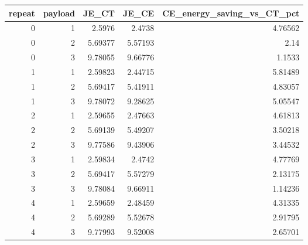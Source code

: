 \begin{tabular}{rrrrr}
\toprule
repeat & payload & JE\_CT & JE\_CE & CE\_energy\_saving\_vs\_CT\_pct \\
\midrule
0 & 1 & 2.5976 & 2.4738 & 4.76562 \\
0 & 2 & 5.69377 & 5.57193 & 2.14 \\
0 & 3 & 9.78055 & 9.66776 & 1.1533 \\
1 & 1 & 2.59823 & 2.44715 & 5.81489 \\
1 & 2 & 5.69417 & 5.41911 & 4.83057 \\
1 & 3 & 9.78072 & 9.28625 & 5.05547 \\
2 & 1 & 2.59655 & 2.47663 & 4.61813 \\
2 & 2 & 5.69139 & 5.49207 & 3.50218 \\
2 & 3 & 9.77586 & 9.43906 & 3.44532 \\
3 & 1 & 2.59834 & 2.4742 & 4.77769 \\
3 & 2 & 5.69417 & 5.57279 & 2.13175 \\
3 & 3 & 9.78084 & 9.66911 & 1.14236 \\
4 & 1 & 2.59659 & 2.48459 & 4.31335 \\
4 & 2 & 5.69289 & 5.52678 & 2.91795 \\
4 & 3 & 9.77993 & 9.52008 & 2.65701 \\
\bottomrule
\end{tabular}
